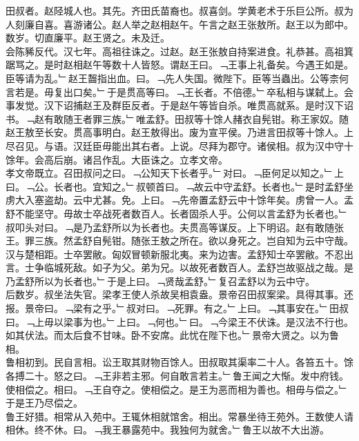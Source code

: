 \documentclass{zhvt-classic}
\begin{document}

\hspace*{2em}田叔者。赵陉城人也。其先。齐田氏苗裔也。叔喜剑。学黄老术于乐巨公所。叔为人刻廉自喜。喜游诸公。赵人举之赵相赵午。午言之赵王张敖所。赵王以为郎中。数岁。切直廉平。赵王贤之。未及迁。\\
\hspace*{2em}会陈豨反代。汉七年。高祖往诛之。过赵。赵王张敖自持案进食。礼恭甚。高祖箕踞骂之。是时赵相赵午等数十人皆怒。谓赵王曰。﹁王事上礼备矣。今遇王如是。臣等请为乱。﹂赵王齧指出血。曰。﹁先人失国。微陛下。臣等当蟲出。公等柰何言若是。毋复出口矣。﹂于是贯高等曰。﹁王长者。不倍德。﹂卒私相与谋弑上。会事发觉。汉下诏捕赵王及群臣反者。于是赵午等皆自杀。唯贯高就系。是时汉下诏书。﹁赵有敢随王者罪三族。﹂唯孟舒。田叔等十馀人赭衣自髡钳。称王家奴。随赵王敖至长安。贯高事明白。赵王敖得出。废为宣平侯。乃进言田叔等十馀人。上尽召见。与语。汉廷臣毋能出其右者。上说。尽拜为郡守。诸侯相。叔为汉中守十馀年。会高后崩。诸吕作乱。大臣诛之。立孝文帝。\\
\hspace*{2em}孝文帝既立。召田叔问之曰。﹁公知天下长者乎。﹂对曰。﹁臣何足以知之。﹂上曰。﹁公。长者也。宜知之。﹂叔顿首曰。﹁故云中守孟舒。长者也。﹂是时孟舒坐虏大入塞盗劫。云中尤甚。免。上曰。﹁先帝置孟舒云中十馀年矣。虏曾一人。孟舒不能坚守。毋故士卒战死者数百人。长者固杀人乎。公何以言孟舒为长者也。﹂叔叩头对曰。﹁是乃孟舒所以为长者也。夫贯高等谋反。上下明诏。赵有敢随张王。罪三族。然孟舒自髡钳。随张王敖之所在。欲以身死之。岂自知为云中守哉。汉与楚相距。士卒罢敝。匈奴冒顿新服北夷。来为边害。孟舒知士卒罢敝。不忍出言。士争临城死敌。如子为父。弟为兄。以故死者数百人。孟舒岂故驱战之哉。是乃孟舒所以为长者也。﹂于是上曰。﹁贤哉孟舒。﹂复召孟舒以为云中守。\\
\hspace*{2em}后数岁。叔坐法失官。梁孝王使人杀故吴相袁盎。景帝召田叔案梁。具得其事。还报。景帝曰。﹁梁有之乎。﹂叔对曰。﹁死罪。有之。﹂上曰。﹁其事安在。﹂田叔曰。﹁上毋以梁事为也。﹂上曰。﹁何也。﹂曰。﹁今梁王不伏诛。是汉法不行也。如其伏法。而太后食不甘味。卧不安席。此忧在陛下也。﹂景帝大贤之。以为鲁相。\\
\hspace*{2em}鲁相初到。民自言相。讼王取其财物百馀人。田叔取其渠率二十人。各笞五十。馀各搏二十。怒之曰。﹁王非若主邪。何自敢言若主。﹂鲁王闻之大惭。发中府钱。使相偿之。相曰。﹁王自夺之。使相偿之。是王为恶而相为善也。相毋与偿之。﹂于是王乃尽偿之。\\
\hspace*{2em}鲁王好猎。相常从入苑中。王辄休相就馆舍。相出。常暴坐待王苑外。王数使人请相休。终不休。曰。﹁我王暴露苑中。我独何为就舍。﹂鲁王以故不大出游。\\
\end{document}
